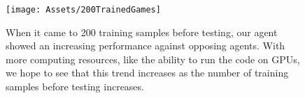 \begin{figure}[b]
	\centering
	\texttt{[image: Assets/200TrainedGames]}
	\caption{When it came to 200 training samples before testing, our agent showed an increasing performance against opposing agents. With more computing resources, like the ability to run the code on GPUs, we hope to see that this trend increases as the number of training samples before testing increases.}
	\label{fig:200TrainedResults}
\end{figure}